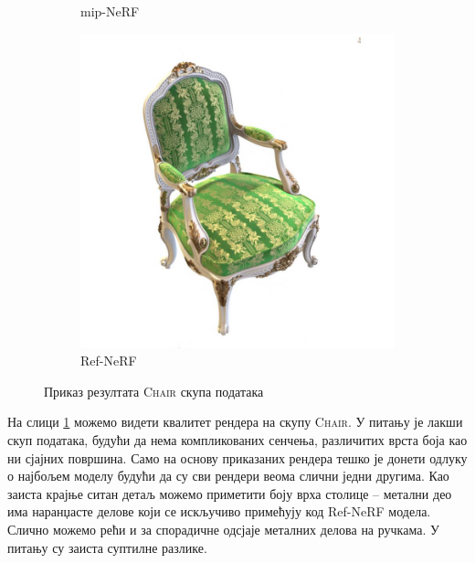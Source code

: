 \documentclass[12pt, a4paper, twoside]{book}
\numberwithin{equation}{chapter}
\numberwithin{theorem}{section}
\numberwithin{definition}{section}
\numberwithin{definitionChapter}{chapter}
\begin{document}
\begin{figure}[H]
\begin{subfigure}{0.475\textwidth}
			\caption{mip-NeRF}
		\end{subfigure}
		\begin{subfigure}{0.475\textwidth}
			\centering
			\includegraphics[scale=0.25]{img/refnerf/refnerf_chair_38.jpg}
			\caption{Ref-NeRF}
		\end{subfigure}
		\caption{Приказ резултата \textsc{Chair} скупа података}
		\label{fig-chair-results}
	\end{figure}

На слици \ref{fig-chair-results} можемо видети квалитет рендера на скупу \textsc{Chair}.
У питању је лакши скуп података, будући да нема компликованих сенчења, различитих врста
боја као ни сјајних површина. Само на основу приказаних рендера тешко је донети одлуку
о најбољем моделу будући да су сви рендери веома слични једни другима. Као заиста крајње ситан
детаљ можемо приметити боју врха столице -- метални део има наранџасте делове који се искључиво примећују
код Ref-NeRF модела. Слично можемо рећи и за спорадичне одсјаје металних делова на ручкама.
У питању су заиста суптилне разлике.
\end{document}

